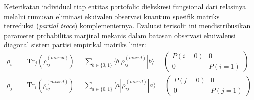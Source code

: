 Keterikatan individual tiap entitas portofolio diekskresi fungsional dari relasinya melalui rumusan eliminasi ekuivalen observasi kuantum spesifik matriks terreduksi (\emph{partial trace}) komplementernya. Evaluasi terisolir ini mendistribusikan parameter probabilitas marjinal mekanis dalam batasan observasi ekuivalensi diagonal sistem partisi empirikal matriks linier:
\begin{align}
\rho_i &= \text{Tr}_j(\rho_{ij}^{(mixed)}) = \sum_{b \in \{0, 1\}} \langle b | \rho_{ij}^{(mixed)} | b \rangle = \begin{pmatrix} P(i=0) & 0 \\ 0 & P(i=1) \end{pmatrix} \\
\rho_j &= \text{Tr}_i(\rho_{ij}^{(mixed)}) = \sum_{a \in \{0, 1\}} \langle a | \rho_{ij}^{(mixed)} | a \rangle = \begin{pmatrix} P(j=0) & 0 \\ 0 & P(j=1) \end{pmatrix}
\end{align}

